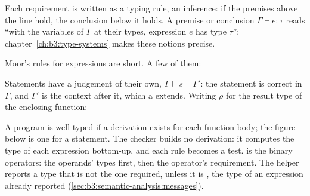 Each requirement is written as a typing rule, an inference: if the premises above the line hold, the conclusion below it holds. A premise or conclusion $\Gamma \vdash e : \tau$ reads ``with the variables of $\Gamma$ at their types, expression $e$ has type $\tau$''; chapter~\ref{ch:b3:type-systems} makes these notions precise.

Moor's rules for expressions are short. A few of them:
Statements have a judgement of their own, $\Gamma \vdash s \dashv \Gamma'$: the statement is correct in $\Gamma$, and $\Gamma'$ is the context after it, which a  extends. Writing $\rho$ for the result type of the enclosing function:
A program is well typed if a derivation exists for each function body; the figure below is one for a statement. The checker builds no derivation: it computes the type of each expression bottom-up, and each rule becomes a test.  is the binary operators: the operands' types first, then the operator's requirement. The helper  reports a type that is not the one required, unless it is , the type of an expression already reported (\cref{sec:b3:semantic-analysis:messages}).

